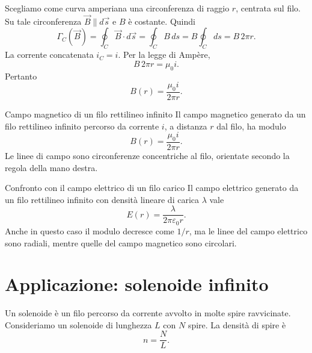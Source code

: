 \documentclass[a4paper]{article}
\begin{document}
\begin{center}
\end{center}

Scegliamo come curva amperiana una circonferenza di raggio \(r\), centrata sul filo. Su tale circonferenza \(\vec{B}\parallel d\vec{s}\) e \(B\) è costante. Quindi
\[
    \Gamma_C(\vec{B})=\oint_C \vec{B}\cdot d\vec{s}
    =\oint_C B\,ds
    =B\oint_C ds
    =B\,2\pi r.
\]
La corrente concatenata  \(i_C=i\). Per la legge di Ampère,
\[
    B\,2\pi r=\mu_0 i.
\]
Pertanto
\[
    B(r)=\frac{\mu_0 i}{2\pi r}.
\]

\begin{snippettheorem}{Campo magnetico di un filo rettilineo infinito}
    Il campo magnetico generato da un filo rettilineo infinito percorso da corrente \(i\), a distanza \(r\) dal filo, ha modulo
    \[
        B(r)=\frac{\mu_0 i}{2\pi r}.
    \]
    Le linee di campo sono circonferenze concentriche al filo, orientate secondo la regola della mano destra.
\end{snippettheorem}

\begin{snippetnote}{Confronto con il campo elettrico di un filo carico}
    Il campo elettrico generato da un filo rettilineo infinito con densità lineare di carica \(\lambda\) vale
    \[
        E(r)=\frac{\lambda}{2\pi\varepsilon_0 r}.
    \]
    Anche in questo caso il modulo decresce come \(1/r\), ma le linee del campo elettrico sono radiali, mentre quelle del campo magnetico sono circolari.
\end{snippetnote}

\section{Applicazione: solenoide infinito}

Un solenoide è un filo percorso da corrente avvolto in molte spire ravvicinate. Consideriamo un solenoide di lunghezza \(L\) con \(N\) spire. La densità di spire è
\[
    n=\frac{N}{L}.
\]

\begin{center}
\end{center}
\end{document}
